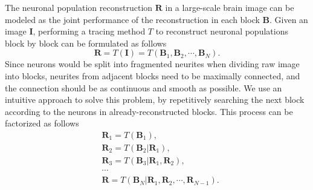 {The neuronal population reconstruction $\mathbf{R}$ in a large-scale brain image can be modeled as the joint performance of the reconstruction in each block $\mathbf{B}$.
Given an image $\mathbf{I}$, performing a tracing method $T$ to reconstruct neuronal populations block by block can be formulated as follows
\begin{equation}
\mathbf{R} = T(\mathbf{I}) = T(\mathbf{B}_1, \mathbf{B}_2,\cdots,\mathbf{B}_N).
\end{equation}
%
Since neurons would be split into fragmented neurites when dividing raw image into blocks, neurites from adjacent blocks need to be maximally connected, and the connection should be as continuous and smooth as possible.
We use an intuitive approach to solve this problem, by repetitively searching the next block according to the neurons in already-reconstructed blocks. This process can be factorized as follows
\begin{equation}
\begin{aligned}
&\mathbf{R}_1 =  T(\mathbf{B}_1), \\
&\mathbf{R}_2 =  T(\mathbf{B}_2 | \mathbf{R}_1), \\
&\mathbf{R}_3 =  T(\mathbf{B}_3 | \mathbf{R}_1, \mathbf{R}_2),\\
&\cdots\\
&\mathbf{R} =  T(\mathbf{B}_N | \mathbf{R}_1, \mathbf{R}_2, \cdots, \mathbf{R}_{N-1}).\\
\end{aligned}
\end{equation}

}

